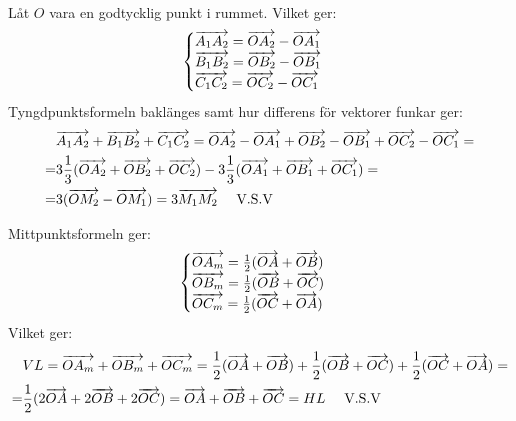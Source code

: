 \begin{task}{2.9}
	Låt $O$ vara en godtycklig punkt i rummet. Vilket ger:
	\[\begin{cases}
	\overrightarrow{A_1A_2}=\overrightarrow{OA_2}-\overrightarrow{OA_1} \\
	\overrightarrow{B_1B_2}=\overrightarrow{OB_2}-\overrightarrow{OB_1} \\
	\overrightarrow{C_1C_2}=\overrightarrow{OC_2}-\overrightarrow{OC_1}
	\end{cases}\]
	Tyngdpunktsformeln baklänges samt hur differens för vektorer funkar ger:
	\begin{align*}
	&\vek{A_1A_2}+\vek{B_1B_2}+\vek{C_1C_2}=
	\vek{OA_2}-\vek{OA_1}+\vek{OB_2}-\vek{OB_1}+\vek{OC_2}-\vek{OC_1}= \\ =
	&3\*\frac{1}{3}(\vek{OA_2}+\vek{OB_2}+\vek{OC_2})-3\*\frac{1}{3}(\vek{OA_1}+\vek{OB_1}+\vek{OC_1})= \\ =
	&3(\vek{OM_2}-\vek{OM_1})=
	3\vek{M_1M_2} \text{~~~~V.S.V}
	\end{align*}
\end{task}

\begin{task}{2.10}
	Mittpunktsformeln ger:
	\[\begin{cases}
	\overrightarrow{OA_m}=\frac{1}{2}(\overrightarrow{OA}+\overrightarrow{OB}) \\
	\overrightarrow{OB_m}=\frac{1}{2}(\overrightarrow{OB}+\overrightarrow{OC}) \\
	\overrightarrow{OC_m}=\frac{1}{2}(\overrightarrow{OC}+\overrightarrow{OA})
	\end{cases}\]
	Vilket ger:
	\begin{align*}
	&VL=\overrightarrow{OA_m}+\overrightarrow{OB_m}+\overrightarrow{OC_m}=
	\frac{1}{2}(\overrightarrow{OA}+\overrightarrow{OB})+\frac{1}{2}(\overrightarrow{OB}+\overrightarrow{OC})+\frac{1}{2}(\overrightarrow{OC}+\overrightarrow{OA})= \\ =
	&\frac{1}{2}(2\overrightarrow{OA}+2\overrightarrow{OB}+2\overrightarrow{OC})=
	\overrightarrow{OA}+\overrightarrow{OB}+\overrightarrow{OC}=HL \text{~~~~V.S.V}
	\end{align*}
\end{task}

